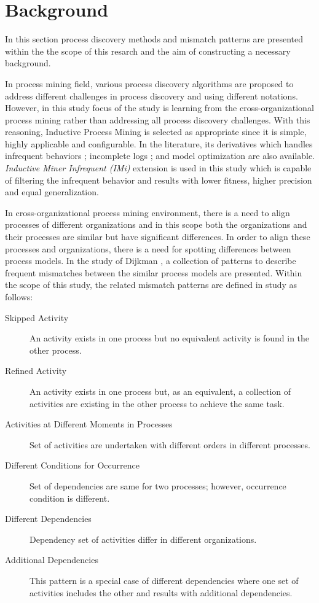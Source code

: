 \section{Background}
\label{sec:background}

In this section process discovery methods and mismatch patterns are presented within the  the scope of this resarch and the aim of constructing a necessary background.

In process mining field, various process discovery algorithms are proposed to address different challenges in process discovery and using different notations. However, in this study focus of the study is learning from the cross-organizational process mining rather than addressing all process discovery challenges. With this reasoning, Inductive Process Mining \cite{leemans2013discovering} is selected as appropriate since it is simple, highly applicable and configurable. In the literature, its derivatives which handles infrequent behaviors \cite{leemans2014discoveringinfrequent}; incomplete logs \cite{leemans2014discoveringincomplete}; and model optimization \cite{weidlich2012profiles} are also available. \textit{Inductive Miner Infrequent (IMi)} \cite{leemans2014discoveringinfrequent} extension is used in this study which is capable of filtering the infrequent behavior and results with lower fitness, higher precision and equal generalization.

In cross-organizational process mining environment, there is a need to align processes of different organizations and in this scope both the organizations and their processes are similar but have significant differences. In order to align these processes and organizations, there is a need for spotting differences between process models. In the study of Dijkman \cite{dijkman2007mismatch}, a collection of patterns to describe frequent mismatches between the similar process models are presented. Within the scope of this study, the related mismatch patterns are defined in study \cite{dijkman2007mismatch} as follows:
\begin{description}
  \item[Skipped Activity] An activity exists in one process but no equivalent activity is found in the other process.
  \item[Refined Activity] An activity exists in one process but, as an equivalent, a collection of activities are existing in the other process to achieve the same task.
  \item[Activities at Different Moments in Processes] Set of activities are undertaken with different orders in different processes.
  \item[Different Conditions for Occurrence] Set of dependencies are same for two processes; however, occurrence condition is different.
  \item[Different Dependencies] Dependency set of activities differ in different organizations.
  \item[Additional Dependencies] This pattern is a special case of different dependencies where one set of activities includes the other and results with additional dependencies.
\end{description}

